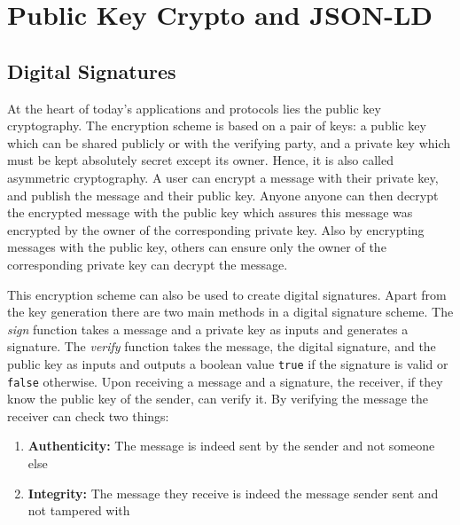 



\section{Public Key Crypto and JSON-LD}

\subsection{Digital Signatures}

At the heart of today's applications and protocols lies the public key cryptography. The encryption scheme is based on a pair of keys: a public key which can be shared publicly or with the verifying party, and a private key which must be kept absolutely secret except its owner. Hence, it is also called asymmetric cryptography. A user can encrypt a message with their private key, and publish the message and their public key. Anyone anyone can then decrypt the encrypted message with the public key which assures this message was encrypted by the owner of the corresponding private key. Also by encrypting messages with the public key, others can ensure only the owner of the corresponding private key can decrypt the message.

This encryption scheme can also be used to create digital signatures. Apart from the key generation there are two main methods in a digital signature scheme. The \textit{sign} function takes a message and a private key as inputs and generates a signature. The \textit{verify} function takes the message, the digital signature, and the public key as inputs and outputs a boolean value \lstinline{true} if the signature is valid or \lstinline{false} otherwise. Upon receiving a message and a signature, the receiver, if they know the public key of the sender, can verify it. By verifying the message the receiver can check two things:
\begin{enumerate}
    \item \textbf{Authenticity:} The message is indeed sent by the sender and not someone else
    \item \textbf{Integrity:} The message they receive is indeed the message sender sent and not tampered with
\end{enumerate}

